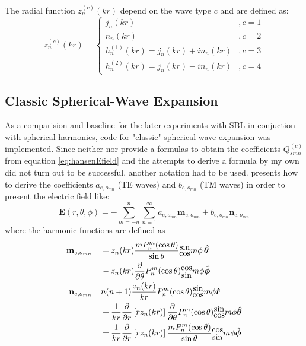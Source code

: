\documentclass{article}
\begin{document}
The radial function \(z_n^{(c)}(kr)\) depend on the wave type \(c\) and are defined as:
\begin{equation}
    z_n^{(c)}(kr) = \begin{cases}
        j_n(kr) & , c = 1 \\
        n_n(kr) & , c = 2 \\
        h_n^{(1)}(kr) = j_n(kr) + i n_n(kr) & , c = 3 \\
        h_n^{(2)}(kr) = j_n(kr) - i n_n(kr) & , c = 4
    \end{cases}
\end{equation}
\subsection{Classic Spherical-Wave Expansion}
As a comparision and baseline for the later experiments with SBL in conjuction with spherical harmonics, code for "classic" spherical-wave expansion was implemented. Since neither \citet{hansen1988spherical} nor \citet{Hofmann2019minimum} provide a formulas to obtain the coefficients \(Q_{smn}^{(c)}\) from equation \ref{eq:hansenEfield} and the attempts to derive a formula by my own did not turn out to be successful, another notation had to be used. \citet{Ludwig1971NearfieldFT} presents how to derive the coefficients \(a_{e,o_{mn}}\) (TE waves) and \(b_{e,o_{mn}}\) (TM waves) in order to present the electric field like:
\begin{equation}
    \mathbf{E}(r,\theta,\phi)=-\sum_{m=-n}^n \sum_{n=1}^\infty a_{e,o_{mn}} \mathbf{m}_{e,o_{mn}} + b_{e,o_{mn}} \mathbf{n}_{e,o_{mn}}
\end{equation}
where the harmonic functions are defined as
\begin{equation}
    \begin{split}
        \mathbf{m}_{e,o_{mn}} =& \mp z_n(kr) \frac{m P_n^m(\cos \theta)}{\sin \theta} \stackanchor{$\sin$}{$\cos$} m \phi \, \boldsymbol{\hat{\theta}} \\
        &- z_n(kr) \frac{\partial}{\partial \theta} P_n^m(\cos \theta)\stackanchor{$\cos$}{$\sin$}m\phi \boldsymbol{\hat{\phi}}\\
        \mathbf{n}_{e,o_{mn}} =& n(n+1) \frac{z_n(kr)}{kr} P_n^m(\cos \theta)\stackanchor{$\sin$}{$\cos$} m \phi \boldsymbol{\hat{r}} \\
        &+ \frac{1}{kr} \frac{\partial}{\partial r} \left[ r z_n(kr) \right] \frac{\partial}{\partial \theta} P_n^m(\cos \theta)\stackanchor{$\sin$}{$\cos$} m \phi \boldsymbol{\hat{\theta}} \\
        &\pm \frac{1}{k r} \frac{\partial}{\partial r} \left[r z_n(k r) \right] \frac{m P_n^m(\cos \theta)}{\sin \theta}\stackanchor{$\cos$}{$\sin$} m \phi \boldsymbol{\hat{\phi}}
    \end{split}
\end{equation} 
\end{document}
